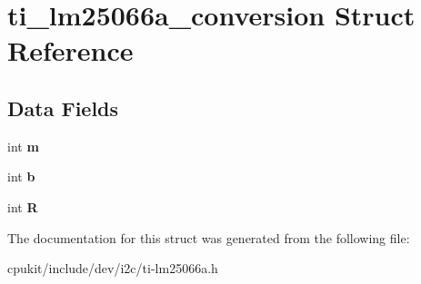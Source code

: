 \hypertarget{structti__lm25066a__conversion}{}\section{ti\+\_\+lm25066a\+\_\+conversion Struct Reference}
\label{structti__lm25066a__conversion}
\subsection*{Data Fields}
\begin{DoxyCompactItemize}
\item 
\mbox{\label{structti__lm25066a__conversion_af4e0704d64aede882fab87baf2f97d9e}} 
int {\bfseries m}
\item 
\mbox{\label{structti__lm25066a__conversion_a75858059f430497682a599e5b2607638}} 
int {\bfseries b}
\item 
\mbox{\label{structti__lm25066a__conversion_a72da98f4dd28adedf9fdd84d92c5d6eb}} 
int {\bfseries R}
\end{DoxyCompactItemize}


The documentation for this struct was generated from the following file\+:\begin{DoxyCompactItemize}
\item 
cpukit/include/dev/i2c/ti-\/lm25066a.\+h\end{DoxyCompactItemize}
